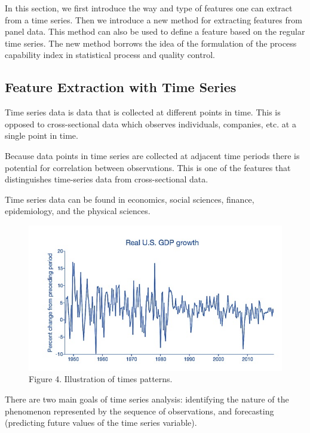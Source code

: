 \documentclass[
]{article}
\begin{document}
In this section, we first introduce the way and type of features one can
extract from a time series. Then we introduce a new method for
extracting features from panel data. This method can also be used to
define a feature based on the regular time series. The new method
borrows the idea of the formulation of the process capability index in
statistical process and quality control.

\hypertarget{feature-extraction-with-time-series}{%
\subsection{Feature Extraction with Time
Series}\label{feature-extraction-with-time-series}}

Time series data is data that is collected at different points in time.
This is opposed to cross-sectional data which observes individuals,
companies, etc. at a single point in time.

Because data points in time series are collected at adjacent time
periods there is potential for correlation between observations. This is
one of the features that distinguishes time-series data from
cross-sectional data.

Time series data can be found in economics, social sciences, finance,
epidemiology, and the physical sciences.

\begin{figure}

{\centering \includegraphics[width=8.56in]{img/w10-What-is-TS} 

}

\caption{Figure 4. Illustration of times patterns.}\label{fig:unnamed-chunk-6}
\end{figure}

There are two main goals of time series analysis: identifying the nature
of the phenomenon represented by the sequence of observations, and
forecasting (predicting future values of the time series variable).
\end{document}
